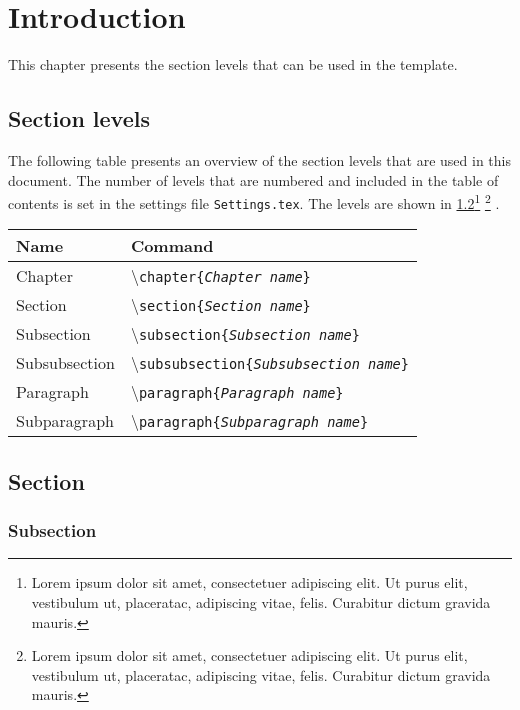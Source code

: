 \chapter{Introduction}
This chapter presents the section levels that can be used in the template.

\section{Section levels}
The following table presents an overview of the section levels that are used in this document. The number of levels that are numbered and included in the table of contents is set in the settings file \texttt{Settings.tex}. The levels are shown in \cref{sec:introduction_section}\footnote{
Lorem ipsum dolor sit amet, consectetuer adipiscing elit. Ut purus elit, vestibulum ut, placeratac, adipiscing vitae, felis. Curabitur dictum gravida mauris.}%
\footnote{Lorem ipsum dolor sit amet, consectetuer adipiscing elit. Ut purus elit, vestibulum ut, placeratac, adipiscing vitae, felis. Curabitur dictum gravida mauris.}%
.

\begin{table}[H]
\centering
\begin{tabular}{ll} \hline\hline
Name & Command\\ \hline
Chapter & \textbackslash\texttt{chapter\{\emph{Chapter name}\}}\\
Section & \textbackslash\texttt{section\{\emph{Section name}\}}\\
Subsection & \textbackslash\texttt{subsection\{\emph{Subsection name}\}}\\
Subsubsection & \textbackslash\texttt{subsubsection\{\emph{Subsubsection name}\}}\\
Paragraph & \textbackslash\texttt{paragraph\{\emph{Paragraph name}\}}\\
Subparagraph & \textbackslash\texttt{paragraph\{\emph{Subparagraph name}\}}\\ \hline\hline
\end{tabular}
\end{table}


\section{Section} \label{sec:introduction_section}
\subsection{Subsection}
